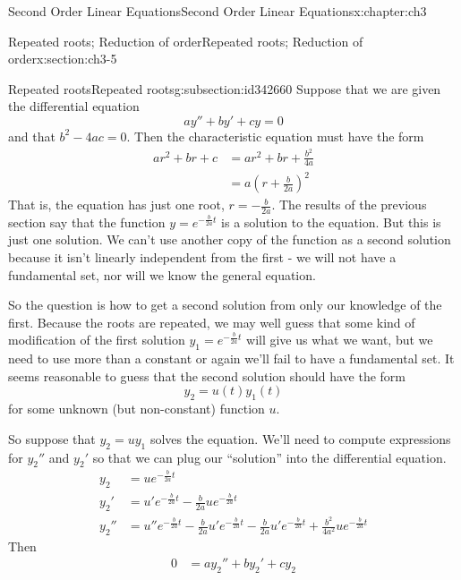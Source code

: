 \documentclass[oneside,10pt,]{book}
\numberwithin{equation}{section}
\numberwithin{equation}{section}
\newcommand{\amp}{&}
\begin{document}
\begin{chapterptx}{Second Order Linear Equations}{}{Second Order Linear Equations}{}{}{x:chapter:ch3}
\begin{sectionptx}{Repeated roots; Reduction of order}{}{Repeated roots; Reduction of order}{}{}{x:section:ch3-5}
%
%
\typeout{************************************************}
\typeout{************************************************}
%
\begin{subsectionptx}{Repeated roots}{}{Repeated roots}{}{}{g:subsection:id342660}
Suppose that we are given the differential equation%
\begin{equation*}
ay'' + by' + cy = 0
\end{equation*}
and that \(b^2 - 4ac = 0\). Then the characteristic equation must have the form%
\begin{align*}
ar^2 + br + c \amp= ar^2 + br + \frac{b^2}{4a}\\
\amp= a(r + \frac{b}{2a})^2
\end{align*}
That is, the equation has just one root, \(r = -\frac{b}{2a}\). The results of the previous section say that the function \(y = e^{-\frac{b}{2a} t}\) is a solution to the equation. But this is just one solution. We can't use another copy of the function as a second solution because it isn't linearly independent from the first - we will not have a fundamental set, nor will we know the general equation.%
\par
So the question is how to get a second solution from only our knowledge of the first. Because the roots are repeated, we may well guess that some kind of modification of the first solution \(y_1 = e^{-\frac{b}{2a} t}\) will give us what we want, but we need to use more than a constant or again we'll fail to have a fundamental set. It seems reasonable to guess that the second solution should have the form%
\begin{equation*}
y_2 = u(t) y_1(t)
\end{equation*}
for some unknown (but non-constant) function \(u\).%
\par
So suppose that \(y_2 = u y_1\) solves the equation. We'll need to compute expressions for \(y_2''\) and \(y_2'\) so that we can plug our ``solution'' into the differential equation.%
\begin{align*}
y_2 \amp= u e^{-\frac{b}{2a}t}\\
y_2' \amp= u' e^{-\frac{b}{2a}t} -\frac{b}{2a} u e^{-\frac{b}{2a}t}\\
y_2'' \amp= u'' e^{-\frac{b}{2a} t} - \frac{b}{2a} u' e^{-\frac{b}{2a}t} - \frac{b}{2a} u' e^{-\frac{b}{2a}t} + \frac{b^2}{4a^2} u e^{-\frac{b}{2a}t}
\end{align*}
Then%
\begin{align*}
0 \amp= ay_2'' + b y_2' + cy_2\\

\end{align*}
\end{subsectionptx}
\end{sectionptx}
\end{chapterptx}
\end{document}
